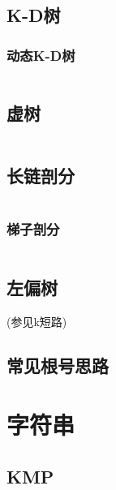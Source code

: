 \documentclass[a4paper]{article}
\begin{document}
\begin{multicols}{2}
			\subsection{K-D树}

				
				\subsubsection{动态K-D树}
					\inputminted{cpp}{../src/datastructure/动态KD树.cpp}
	
	
	
			
	
			\subsection{虚树}
				\inputminted{cpp}{../src/datastructure/虚树.cpp}
	
			\subsection{长链剖分}
				\inputminted{cpp}{../src/datastructure/长链剖分.cpp}
	
			\subsubsection{梯子剖分}
				\inputminted{cpp}{../src/datastructure/梯子剖分.cpp}
					
			\subsection{左偏树}
				(参见k短路)
	
			\subsection{常见根号思路}
				

		\section{字符串}
			\subsection{KMP}
				\inputminted{cpp}{../src/string/KMP.cpp}
				

\end{multicols}
\end{document}
